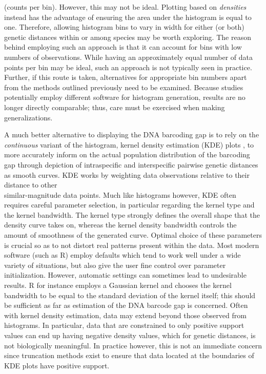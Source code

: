 (counts per bin). However, this may not be ideal. Plotting based on \textit{densities} instead has the advantage of ensuring the area under the histogram is equal to one. Therefore, allowing histogram bins to vary in width for either (or both) genetic distances within or among species may be worth exploring. The reason behind employing such an approach is that it can account for bins with low numbers of observations. While having an approximately equal number of data points per bin may be ideal, such an approach is not typically seen in practice. Further, if this route is taken, alternatives for appropriate bin numbers apart from the methods outlined previously need to be examined. Because studies potentially employ different software for histogram generation, results are no longer directly comparable; thus, care must be exercised when making generalizations.



A much better alternative to displaying the DNA barcoding gap is to rely on the \\ \textit{continuous} variant of the histogram, kernel density estimation (KDE) plots \cite{rosenblatt1956remarks, parzen1962estimation}, to more accurately inform on the actual population distribution of the barcoding gap through depiction of intraspecific and interspecific pairwise genetic distances as smooth curves. KDE works by weighting data observations relative to their distance to other \\ similar-magnitude data points. Much like histograms however, KDE often requires careful parameter selection, in particular regarding the kernel type and the kernel bandwidth. The kernel type strongly defines the overall shape that the density curve takes on, whereas the kernel density bandwidth controls the amount of smoothness of the generated curve. Optimal choice of these parameters is crucial so as to not distort real patterns present within the data. Most modern software (such as R) employ defaults which tend to work well under a wide variety of situations, but also give the user fine control over parameter initialization. However, automatic settings can sometimes lead to undesirable results. R for instance employs a Gaussian kernel and chooses the kernel bandwidth to be equal to the standard deviation of the kernel itself; this should be sufficient as far as estimation of the DNA barcode gap is concerned. Often with kernel density estimation, data may extend beyond those observed from histograms. In particular, data that are constrained to only positive support values can end up having negative density values, which for genetic distances, is not biologically meaningful. In practice however, this is not an immediate concern since truncation methods exist to ensure that data located at the boundaries of KDE plots have positive support.    



